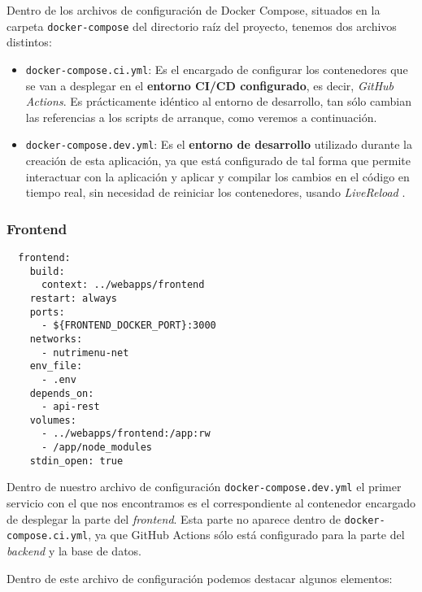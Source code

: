 Dentro de los archivos de configuración de Docker Compose, situados en la carpeta \verb,docker-compose, del directorio raíz del proyecto, tenemos dos archivos distintos:

\begin{itemize}
	\item \verb,docker-compose.ci.yml,: Es el encargado de configurar los contenedores que se van a desplegar en el \textbf{entorno CI/CD configurado}, es decir, \textit{GitHub Actions}. Es prácticamente idéntico al entorno de desarrollo, tan sólo cambian las referencias a los scripts de arranque, como veremos a continuación.
	\item \verb,docker-compose.dev.yml,: Es el \textbf{entorno de desarrollo} utilizado durante la creación de esta aplicación, ya que está configurado de tal forma que permite interactuar con la aplicación y aplicar y compilar los cambios en el código en tiempo real, sin necesidad de reiniciar los contenedores, usando \textit{LiveReload} \cite{codejava:livereload}.
\end{itemize}

\subsubsection{Frontend}

\begin{lstlisting}
  frontend:
    build:
      context: ../webapps/frontend
    restart: always
    ports:
      - ${FRONTEND_DOCKER_PORT}:3000
    networks:
      - nutrimenu-net
    env_file:
      - .env
    depends_on:
      - api-rest
    volumes:
      - ../webapps/frontend:/app:rw
      - /app/node_modules
    stdin_open: true	
\end{lstlisting}

Dentro de nuestro archivo de configuración \verb,docker-compose.dev.yml, el primer servicio con el que nos encontramos es el correspondiente al contenedor encargado de desplegar la parte del \textit{frontend}. Esta parte no aparece dentro de \verb,docker-compose.ci.yml,, ya que GitHub Actions sólo está configurado para la parte del \textit{backend} y la base de datos. 

Dentro de este archivo de configuración podemos destacar algunos elementos:

